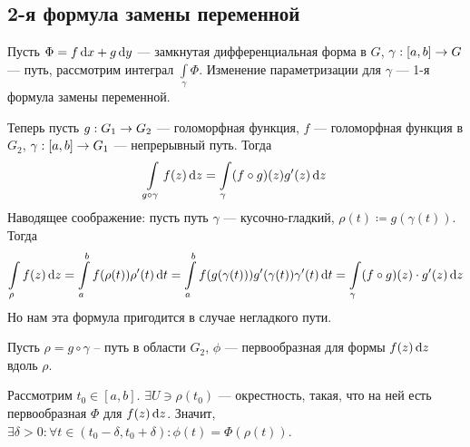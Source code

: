 \documentclass[a4paper]{report}
\begin{document}
    \subsection{2-я формула замены переменной}
    Пусть $\Phi = f \operatorname{d}\! x + g \operatorname{d}\! y$ --- замкнутая дифференциальная форма в $G$, $\gamma: [a, b] \rightarrow G$ --- путь, рассмотрим интеграл $\int\limits_{\gamma}\Phi$.
    Изменение параметризации для $\gamma$ --- 1-я формула замены переменной.

    Теперь пусть $g: G_1 \rightarrow G_2$ --- голоморфная функция, $f$ --- голоморфная функция в $G_2$, $\gamma: [a, b] \rightarrow G_1$ --- непрерывный путь.
    Тогда
    \[\int\limits_{g \circ \gamma}f(z)\operatorname{d}\! z = \int\limits_{\gamma}(f \circ g)(z) g'(z)\operatorname{d}\! z\]
    Наводящее соображение: пусть путь $\gamma$ --- кусочно-гладкий, $\rho(t) \coloneqq g(\gamma(t))$.
    Тогда \[\int\limits_{\rho}f(z)\operatorname{d}\! z = \int\limits_{a}^{b}f(\rho(t))\rho'(t)\operatorname{d}\! t = \int\limits_{a}^{b}f(g(\gamma(t)))g'(\gamma(t))\gamma'(t)\operatorname{d}\! t = \int\limits_{\gamma}(f \circ g)(z)\cdot g'(z)\operatorname{d}\! z\]
    Но нам эта формула пригодится в случае негладкого пути.

    Пусть $\rho = g \circ \gamma$ -- путь в области $G_2$, $\phi$ --- первообразная для формы $f(z)\operatorname{d}\! z$ вдоль $\rho$.

    Рассмотрим $t_0 \in [a, b]$. $\exists U \ni \rho(t_0)$ --- окрестность, такая, что на ней есть первообразная $\Phi$ для $f(z)\operatorname{d}\! z$.
    Значит, $\exists \delta > 0: \forall t \in (t_0 - \delta, t_0 + \delta): \phi(t) = \Phi(\rho(t))$.
\end{document}
